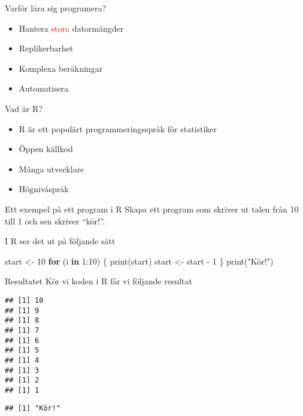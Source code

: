 \documentclass[
  10pt,
  ignorenonframetext,
]{beamer}
\newenvironment{Shaded}{\begin{snugshade}}{\end{snugshade}}
\newcommand{\ControlFlowTok}[1]{\textcolor[rgb]{0.13,0.29,0.53}{\textbf{#1}}}
\newcommand{\DecValTok}[1]{\textcolor[rgb]{0.00,0.00,0.81}{#1}}
\newcommand{\FunctionTok}[1]{\textcolor[rgb]{0.00,0.00,0.00}{#1}}
\newcommand{\NormalTok}[1]{#1}
\newcommand{\OtherTok}[1]{\textcolor[rgb]{0.56,0.35,0.01}{#1}}
\newcommand{\SpecialCharTok}[1]{\textcolor[rgb]{0.00,0.00,0.00}{#1}}
\newcommand{\StringTok}[1]{\textcolor[rgb]{0.31,0.60,0.02}{#1}}
\providecommand{\tightlist}{%
  \setlength{\itemsep}{0pt}\setlength{\parskip}{0pt}}
\begin{document}
\begin{frame}{Varför lära sig programera?}
\protect\hypertarget{varfuxf6r-luxe4ra-sig-programera}{}
\begin{itemize}[<+->]
\tightlist
\item
  Hantera \textcolor{red}{stora} datormängder
\item
  Replikerbarhet
\item
  Komplexa beräkningar
\item
  Automatisera
\end{itemize}
\end{frame}

\begin{frame}{Vad är R?}
\protect\hypertarget{vad-uxe4r-r}{}
\begin{itemize}[<+->]
\tightlist
\item
  R är ett populärt programmeringsspråk för statistiker
\item
  Öppen källkod
\item
  Många utvecklare
\item
  Högnivåspråk
\end{itemize}
\end{frame}

\begin{frame}[fragile]{Ett exempel på ett program i R}
\protect\hypertarget{ett-exempel-puxe5-ett-program-i-r}{}
Skapa ett program som skriver ut talen från 10 till 1 och sen skriver
``kör!''.

\pause

I R ser det ut på följande sätt

\begin{Shaded}
\begin{Highlighting}[]
\NormalTok{start }\OtherTok{\textless{}{-}} \DecValTok{10}
\ControlFlowTok{for}\NormalTok{ (i }\ControlFlowTok{in} \DecValTok{1}\SpecialCharTok{:}\DecValTok{10}\NormalTok{) \{}
  \FunctionTok{print}\NormalTok{(start)}
\NormalTok{  start }\OtherTok{\textless{}{-}}\NormalTok{ start }\SpecialCharTok{{-}} \DecValTok{1}
\NormalTok{\}}
\FunctionTok{print}\NormalTok{(}\StringTok{"Kör!"}\NormalTok{)}
\end{Highlighting}
\end{Shaded}
\end{frame}

\begin{frame}[fragile]{Resultatet}
\protect\hypertarget{resultatet}{}
Kör vi koden i R får vi följande resultat

\begin{verbatim}
## [1] 10
## [1] 9
## [1] 8
## [1] 7
## [1] 6
## [1] 5
## [1] 4
## [1] 3
## [1] 2
## [1] 1
\end{verbatim}

\begin{verbatim}
## [1] "Kör!"
\end{verbatim}
\end{frame}
\end{document}
